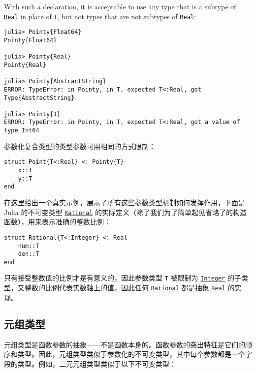 With such a declaration, it is acceptable to use any type that is a subtype of \hyperlink{6175959395021454412}{\texttt{Real}} in place of \texttt{T}, but not types that are not subtypes of \texttt{Real}:




\begin{verbatim}
julia> Pointy{Float64}
Pointy{Float64}

julia> Pointy{Real}
Pointy{Real}

julia> Pointy{AbstractString}
ERROR: TypeError: in Pointy, in T, expected T<:Real, got Type{AbstractString}

julia> Pointy{1}
ERROR: TypeError: in Pointy, in T, expected T<:Real, got a value of type Int64
\end{verbatim}



参数化复合类型的类型参数可用相同的方式限制：




\begin{verbatim}
struct Point{T<:Real} <: Pointy{T}
    x::T
    y::T
end
\end{verbatim}



在这里给出一个真实示例，展示了所有这些参数类型机制如何发挥作用，下面是 Julia 的不可变类型 \hyperlink{8304566144531167610}{\texttt{Rational}} 的实际定义（除了我们为了简单起见省略了的构造函数），用来表示准确的整数比例：




\begin{verbatim}
struct Rational{T<:Integer} <: Real
    num::T
    den::T
end
\end{verbatim}



只有接受整数值的比例才是有意义的，因此参数类型 \texttt{T} 被限制为 \hyperlink{8469131683393450448}{\texttt{Integer}} 的子类型，又整数的比例代表实数轴上的值，因此任何 \hyperlink{8304566144531167610}{\texttt{Rational}} 都是抽象 \hyperlink{6175959395021454412}{\texttt{Real}} 的实现。



\hypertarget{5158816437121320312}{}


\subsection{元组类型}



元组类型是函数参数的抽象——不是函数本身的。函数参数的突出特征是它们的顺序和类型。因此，元组类型类似于参数化的不可变类型，其中每个参数都是一个字段的类型。例如，二元元组类型类似于以下不可变类型：




